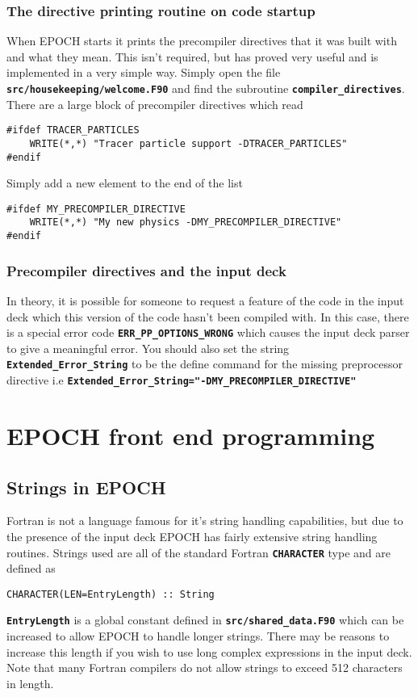 \documentclass[12pt]{article}
\newcommand{\simpleboxverbatim}{\begin{Verbatim}[obeytabs=true,frame=single,
  framerule=0.5mm,rulecolor=\color{warwickmid}]}
\newcommand{\inlinecode}[1]{{\color{warwickred} \bf\texttt{#1}}}
\newcommand{\EPOCH}{{\color{warwickdark}\fontfamily{phv}\selectfont EPOCH} }
\begin{document}
\subsubsection{The directive printing routine on code startup}
When \EPOCH starts it prints the precompiler directives that it was built with
and what they mean. This isn't required, but has proved very useful and is
implemented in a very simple way.  Simply open the file
\inlinecode{src/housekeeping/welcome.F90} and find the subroutine
\inlinecode{compiler\_directives}. There are a large block of precompiler
directives which read

\simpleboxverbatim
#ifdef TRACER_PARTICLES
    WRITE(*,*) "Tracer particle support -DTRACER_PARTICLES"
#endif
\end{Verbatim}

Simply add a new element to the end of the list
\simpleboxverbatim
#ifdef MY_PRECOMPILER_DIRECTIVE
    WRITE(*,*) "My new physics -DMY_PRECOMPILER_DIRECTIVE"
#endif
\end{Verbatim}

\subsubsection{Precompiler directives and the input deck}
In theory, it is possible for someone to request a feature of the code in the
input deck which this version of the code hasn't been compiled with. In this
case, there is a special error code \inlinecode{ERR\_PP\_OPTIONS\_WRONG} which
causes the input deck parser to give a meaningful error. You should also set
the string \inlinecode{Extended\_Error\_String} to be the define command for
the missing preprocessor directive i.e
\inlinecode{Extended\_Error\_String="-DMY\_PRECOMPILER\_DIRECTIVE"}

\section{\EPOCH front end programming}

\subsection{Strings in \EPOCH}
Fortran is not a language famous for it's string handling capabilities, but due
to the presence of the input deck \EPOCH has fairly extensive string handling
routines. Strings used are all of the standard Fortran \inlinecode{CHARACTER}
type and are defined as
\simpleboxverbatim
CHARACTER(LEN=EntryLength) :: String
\end{Verbatim}
\inlinecode{EntryLength} is a global constant defined in
\inlinecode{src/shared\_data.F90} which can be increased to allow \EPOCH to
handle longer strings. There may be reasons to increase this length if you wish
to use long complex expressions in the input deck. Note that many Fortran
compilers do not allow strings to exceed 512 characters in length.
\end{document}

